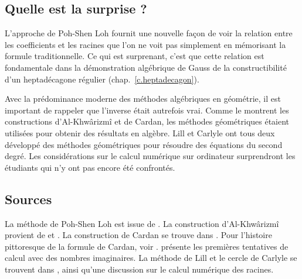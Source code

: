 \subsection*{Quelle est la surprise ?}

L'approche de Poh-Shen Loh fournit une nouvelle façon de voir la relation entre les coefficients et les racines que l'on ne voit pas simplement en mémorisant la formule traditionnelle. Ce qui est surprenant, c'est que cette relation est fondamentale dans la démonstration algébrique de Gauss de la constructibilité d'un heptadécagone régulier (chap.~\ref{c.heptadecagon}).

Avec la prédominance moderne des méthodes algébriques en géométrie, il est important de rappeler que l'inverse était autrefois vrai. Comme le montrent les constructions d'Al-Khwârizmî et de Cardan, les méthodes géométriques étaient utilisées pour obtenir des résultats en algèbre. Lill et Carlyle ont tous deux développé des méthodes géométriques pour résoudre des équations du second degré. Les considérations sur le calcul numérique sur ordinateur surprendront les étudiants qui n'y ont pas encore été confrontés.

\subsection*{Sources}
La méthode de Poh-Shen Loh est issue de \cite{loh1,loh2}. La construction d'Al-Khwârizmî provient de \cite[chap.~1]{jorg} et \cite{mastin}. La construction de Cardan se trouve dans \cite[chap.~1]{jorg}. Pour l'histoire pittoresque  de la formule de Cardan, voir \cite{wiki:cardano}. \cite[chap.~2]{jorg} présente les premières tentatives de calcul avec des nombres imaginaires. La méthode de Lill et le cercle de Carlyle se trouvent dans \cite{wiki:quadratic}, ainsi qu'une discussion sur le calcul numérique des racines.

